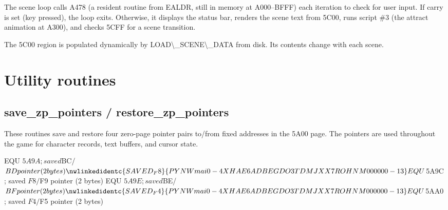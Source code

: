 \documentclass[10pt]{report}
\begin{document}
The scene loop calls {\Tt{}{\$}A478\nwendquote} (a resident routine from EALDR, still in
memory at {\Tt{}{\$}A000\nwendquote}--{\Tt{}{\$}BFFF\nwendquote}) each iteration to check for user input.
If carry is set (key pressed), the loop exits.  Otherwise, it displays
the status bar, renders the scene text from {\Tt{}{\$}5C00\nwendquote}, runs script \#3
(the attract animation at {\Tt{}{\$}A300\nwendquote}), and checks {\Tt{}{\$}5CFF\nwendquote} for a scene
transition.

The {\Tt{}{\$}5C00\nwendquote} region is populated dynamically by {\Tt{}LOAD{\textbackslash}{\_}SCENE{\textbackslash}{\_}DATA\nwendquote}
from disk.  Its contents change with each scene.

\section{Utility routines}

\subsection{save\_zp\_pointers / restore\_zp\_pointers}

These routines save and restore four zero-page pointer pairs to/from
fixed addresses in the {\Tt{}{\$}5A00\nwendquote} page.  The pointers are used throughout
the game for character records, text buffers, and cursor state.

\nwenddocs{}\plusendmoddef\nwstartdeflinemarkup{}\nwenddeflinemarkup
{}            EQU     $5A9A   ; saved $BC/$BD pointer (2 bytes)
\nwlinkedidentc{SAVED_F8}{PYNWmai0-4XHAE6ADBEGDO3TDMJXX7ROHNM000000-13}            EQU     $5A9C   ; saved $F8/$F9 pointer (2 bytes)
            EQU     $5A9E   ; saved $BE/$BF pointer (2 bytes)
\nwlinkedidentc{SAVED_F4}{PYNWmai0-4XHAE6ADBEGDO3TDMJXX7ROHNM000000-13}            EQU     $5AA0   ; saved $F4/$F5 pointer (2 bytes)
\eatline
{}\nwendcode{}\nwdocspar
\end{document}
